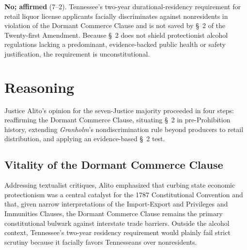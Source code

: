 \documentclass[12pt]{article}
\begin{document}
\textbf{No; affirmed} (7--2). Tennessee's two-year durational-residency requirement for retail liquor license applicants facially discriminates against nonresidents in violation of the Dormant Commerce Clause and is not saved by \S~2 of the Twenty-first Amendment. Because \S~2 does not shield protectionist alcohol regulations lacking a predominant, evidence-backed public health or safety justification, the requirement is unconstitutional.

\section{Reasoning}

Justice Alito's opinion for the seven-Justice majority proceeded in four steps: reaffirming the Dormant Commerce Clause, situating \S~2 in pre-Prohibition history, extending \textit{Granholm}'s nondiscrimination rule beyond producers to retail distribution, and applying an evidence-based \S~2 test.

\subsection{Vitality of the Dormant Commerce Clause}
Addressing textualist critiques, Alito emphasized that curbing state economic protectionism was a central catalyst for the 1787 Constitutional Convention and that, given narrow interpretations of the Import-Export and Privileges and Immunities Clauses, the Dormant Commerce Clause remains the primary constitutional bulwark against interstate trade barriers. Outside the alcohol context, Tennessee's two-year residency requirement would plainly fail strict scrutiny because it facially favors Tennesseans over nonresidents.
\end{document}
